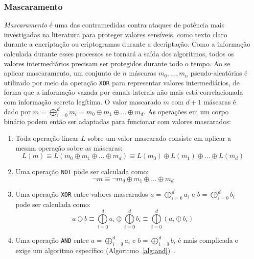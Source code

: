 \documentclass{SBCbookchapter}
\begin{document}
\subsubsection*{Mascaramento}

\emph{Mascaramento} é uma das contramedidas contra ataques de potência mais investigadas na literatura para proteger valores sensíveis, como texto claro durante a encriptação ou criptogramas durante a decriptação. Como a informação calculada durante esses processos se tornará a saída dos algoritmos, todos os valores intermediários precisam ser protegidos durante todo o tempo. Ao se aplicar mascaramento, um conjunto de $n$ máscaras $m_0,\ldots,m_n$ pseudo-aleatórias é utilizado por meio da operação \texttt{XOR} para representar valores intermediários, de forma que a informação vazada por canais laterais não mais está correlacionada com informação secreta legítima. O valor mascarado $m$ com $d+1$ máscaras é dado por $m = \bigoplus\limits_{i=0}^{d}m_i  = m_0 \oplus m_1 \oplus \ldots \oplus m_d$. As operações em um corpo binário podem então ser adaptadas para funcionar com valores mascarados: 
\begin{enumerate}
        \item Toda operação linear $L$ sobre um valor mascarado consiste em aplicar a mesma operação sobre as máscaras:
        $$L(m) \equiv L(m_0 \oplus m_1 \oplus \ldots \oplus m_d) \equiv L(m_0)  \oplus L(m_1) \oplus \ldots \oplus L(m_d)$$
        \item Uma operação \texttt{NOT} pode ser calculada como:
        $$\neg m \equiv \neg m_0 \oplus m_1 \oplus \ldots \oplus m_d$$
        \item Uma operação \texttt{XOR} entre valores mascarados $a =  \bigoplus\limits_{i=0}^{d}a_i$ e $b =  \bigoplus\limits_{i=0}^{d}b_i$ pode ser calculada como:
        $$ a \oplus b \equiv \bigoplus\limits_{i=0}^{d}a_i \oplus \bigoplus\limits_{i=0}^{d}b_i \equiv \bigoplus\limits_{i=0}^{d}(a_i \oplus b_i)$$
        \item Uma operação \texttt{AND} entre $a =  \bigoplus\limits_{i=0}^{d}a_i$ e $b =  \bigoplus\limits_{i=0}^{d}b_i$ é mais complicada e exige um algoritmo específico (Algoritmo~\ref{alg:and})~\cite{IshaiSW03}.
\end{enumerate}
\end{document}
